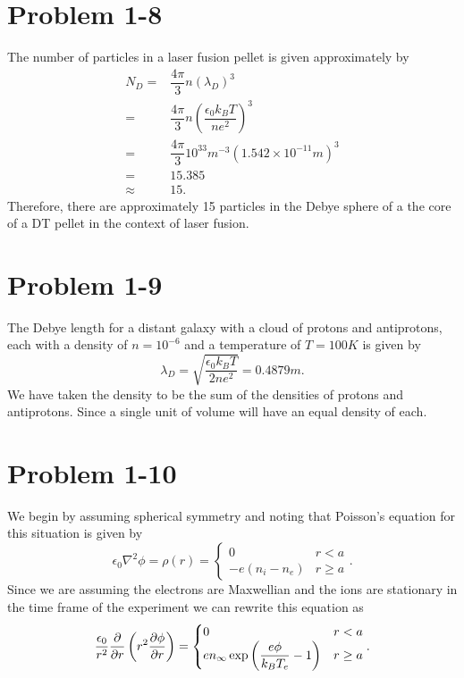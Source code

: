 \section*{Problem 1-8}
\label{sec:1-8}
The number of particles in a laser fusion pellet is given approximately by
\begin{align}
	N_D =& \dfrac{4\pi}{3}n \left(\lambda_D\right)^{3}\\
	=& \dfrac{4\pi}{3}n \left(\dfrac{\epsilon_0k_BT}{ne^2}\right)^{3}\\
	=& \dfrac{4\pi}{3} 10^{33}m^{-3} \left(1.542\times 10^{-11}m\right)^3\\
	=& 15.385 \\
	\approx& 15.
\end{align}
Therefore, there are approximately 15 particles in the Debye sphere of a the core of a DT pellet in the context of laser fusion.

\section*{Problem 1-9}
\label{sec:1-9}
The Debye length for a distant galaxy with a cloud of protons and antiprotons, each with a density of \(n = 10^{-6}\) and a temperature of \(T=100K\) is given by
\begin{equation}
	\lambda_D = \sqrt{\dfrac{\epsilon_0k_BT}{2ne^2}} = 0.4879m.
\end{equation}
We have taken the density to be the sum of the densities of protons and antiprotons. Since a single unit of volume will have an equal density of each.

\section*{Problem 1-10}
\label{sec:1-10}
We begin by assuming spherical symmetry and noting that Poisson's equation for this situation is given by
\begin{equation}
	\epsilon_0 \nabla^2 \phi = \rho(r) = \begin{cases} 
	0 & r < a \\
	-e\left(n_i-n_e\right) & r \geq a
	\end{cases}.
\end{equation}
Since we are assuming the electrons are Maxwellian and the ions are stationary in the time frame of the experiment we can rewrite this equation as
\begin{equation}
	\dfrac{\epsilon_0}{r^2} \dfrac{\partial}{\partial r} \left(r^2\frac{\partial \phi}{\partial r}\right)  = \begin{cases} 
	0 & r < a \\
	en_\infty\exp{\left(\dfrac{e\phi}{k_BT_e}-1\right)} & r \geq a
	\end{cases}.
\end{equation}

